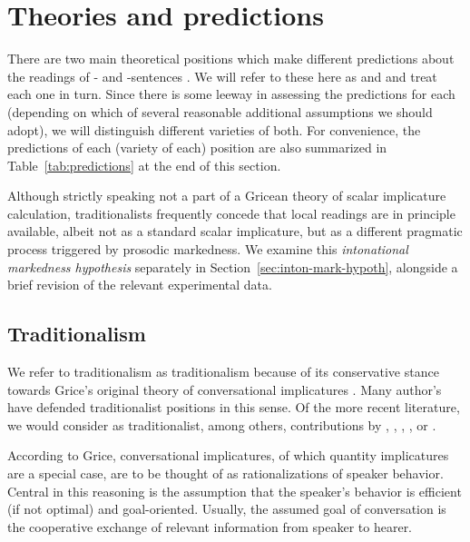 \documentclass[fleqn,reqno,10pt,draft]{article}
\newcommand{\as}{\acro{as}}
\renewcommand{\es}{\acro{es}}
\begin{document}
\section{Theories and predictions}
\label{sec:theories-predictions}

There are two main theoretical positions which make different
predictions about the readings of \as- and \es-sentences
\citep[c.f.][for
overview]{Horn2006:The-Border-Wars,Geurts2010:Quantity-Implic,Sauerland2012:The-Computation}. We
will refer to these here as  and
 and treat each one in turn. Since there is
some leeway in assessing the predictions for each (depending on which
of several reasonable additional assumptions we should adopt), we will
distinguish different varieties of both. For convenience, the
predictions of each (variety of each) position are also summarized in
Table~\ref{tab:predictions} at the end of this section.

Although strictly speaking not a part of a Gricean theory of scalar
implicature calculation, traditionalists frequently concede that local
readings are in principle available, albeit not as a standard scalar
implicature, but as a different pragmatic process triggered by
prosodic markedness. We examine this \emph{intonational markedness
  hypothesis} separately in Section~\ref{sec:inton-mark-hypoth},
alongside a brief revision of the relevant experimental data.

\subsection{Traditionalism}
\label{sec:traditionalism}

We refer to traditionalism as traditionalism because of its
conservative stance towards Grice's original theory of conversational
implicatures \citep{Grice1975:Logic-and-Conve}. Many author's have
defended traditionalist positions in this sense. Of the more recent
literature, we would consider as traditionalist, among others,
contributions by \citet{Spector2006:Scalar-Implicat},
\citet{Sauerland2004:Scalar-Implicat},
\citet{Russell2006:Against-Grammat},
\citet{vanRooijSchulz:ExhaustiveInterpretation},
\citet{Geurts2010:Quantity-Implic} or
\citet{Franke2011:Quantity-Implic}.

According to Grice, conversational implicatures, of which quantity
implicatures are a special case, are to be thought of as
rationalizations of speaker behavior. Central in this reasoning is the
assumption that the speaker's behavior is efficient (if not optimal)
and goal-oriented. Usually, the assumed goal of conversation is the
cooperative exchange of relevant information from speaker to hearer.
\end{document}
